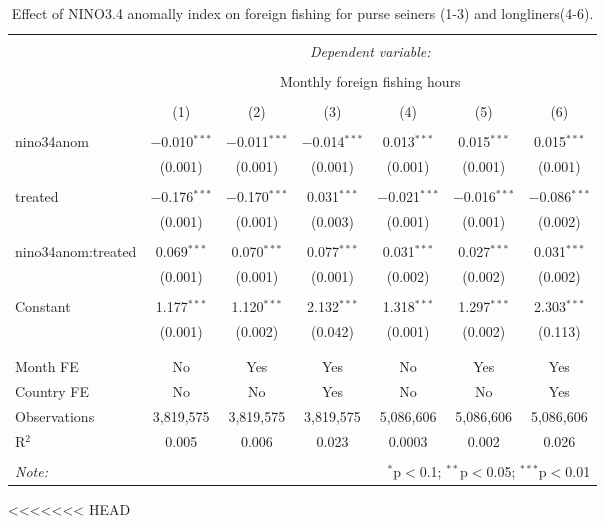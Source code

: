 
\begin{table}[!htbp] \centering 
  \caption{\label{tab:ff_reg}Effect of NINO3.4 anomally index on foreign fishing for purse seiners (1-3) and longliners(4-6).} 
  \label{} 
\begin{tabular}{@{\extracolsep{5pt}}lcccccc} 
\\[-1.8ex]\hline 
\hline \\[-1.8ex] 
 & \multicolumn{6}{c}{\textit{Dependent variable:}} \\ 
\cline{2-7} 
\\[-1.8ex] & \multicolumn{6}{c}{Monthly foreign fishing hours} \\ 
\\[-1.8ex] & (1) & (2) & (3) & (4) & (5) & (6)\\ 
\hline \\[-1.8ex] 
 nino34anom & $-$0.010$^{***}$ & $-$0.011$^{***}$ & $-$0.014$^{***}$ & 0.013$^{***}$ & 0.015$^{***}$ & 0.015$^{***}$ \\ 
  & (0.001) & (0.001) & (0.001) & (0.001) & (0.001) & (0.001) \\ 
  & & & & & & \\ 
 treated & $-$0.176$^{***}$ & $-$0.170$^{***}$ & 0.031$^{***}$ & $-$0.021$^{***}$ & $-$0.016$^{***}$ & $-$0.086$^{***}$ \\ 
  & (0.001) & (0.001) & (0.003) & (0.001) & (0.001) & (0.002) \\ 
  & & & & & & \\ 
 nino34anom:treated & 0.069$^{***}$ & 0.070$^{***}$ & 0.077$^{***}$ & 0.031$^{***}$ & 0.027$^{***}$ & 0.031$^{***}$ \\ 
  & (0.001) & (0.001) & (0.001) & (0.002) & (0.002) & (0.002) \\ 
  & & & & & & \\ 
 Constant & 1.177$^{***}$ & 1.120$^{***}$ & 2.132$^{***}$ & 1.318$^{***}$ & 1.297$^{***}$ & 2.303$^{***}$ \\ 
  & (0.001) & (0.002) & (0.042) & (0.001) & (0.002) & (0.113) \\ 
  & & & & & & \\ 
\hline \\[-1.8ex] 
Month FE & No & Yes & Yes & No & Yes & Yes \\ 
Country FE & No & No & Yes & No & No & Yes \\ 
Observations & 3,819,575 & 3,819,575 & 3,819,575 & 5,086,606 & 5,086,606 & 5,086,606 \\ 
R$^{2}$ & 0.005 & 0.006 & 0.023 & 0.0003 & 0.002 & 0.026 \\ 
\hline 
\hline \\[-1.8ex] 
\textit{Note:}  & \multicolumn{6}{r}{$^{*}$p$<$0.1; $^{**}$p$<$0.05; $^{***}$p$<$0.01} \\ 
\end{tabular} 
<<<<<<< HEAD
\end{table} 

